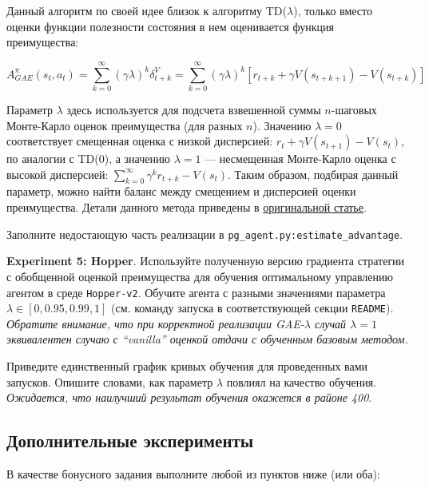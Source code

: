 \documentclass[12pt, oneside]{article}
\begin{document}
Данный алгоритм по своей идее близок к алгоритму TD($\lambda$), только вместо оценки функции полезности состояния в нем оценивается функция преимущества:

\begin{equation}
    A_{GAE}^\pi (s_t, a_t) = \sum_{k=0}^{\infty} {(\gamma \lambda)^k \delta_{t+k}^V} = \sum_{k=0}^{\infty} {(\gamma \lambda)^k [r_{t+k} + \gamma V(s_{t+k+1}) - V(s_{t+k})]}
\end{equation}

\noindent
Параметр $\lambda$ здесь используется для подсчета взвешенной суммы $n$-шаговых Монте-Карло оценок преимущества (для разных $n$). Значению $\lambda = 0$ соответствует смещенная оценка с низкой дисперсией: $r_t + \gamma V(s_{t+1}) - V(s_t)$, по аналогии с TD(0), а значению $\lambda = 1$ --- несмещенная Монте-Карло оценка с высокой дисперсией: $\sum_{k=0}^{\infty} {\gamma^k r_{t+k}} - V(s_t)$. Таким образом, подбирая данный параметр, можно найти баланс между смещением и дисперсией оценки преимущества. Детали данного метода приведены в \href{https://arxiv.org/pdf/1506.02438.pdf}{оригинальной статье}.

Заполните недостающую часть реализации в \verb|pg_agent.py:estimate_advantage|.

\textbf{Experiment 5: Hopper}. Используйте полученную версию градиента стратегии с обобщенной оценкой преимущества для обучения оптимальному управлению агентом в среде \verb|Hopper-v2|. Обучите агента с разными значениями параметра $\lambda \in [0, 0.95, 0.99, 1]$ (см. команду запуска в соответствующей секции \verb|README|). \textit{Обратите внимание, что при корректной реализации GAE-$\lambda$ случай $\lambda = 1$ эквивалентен случаю с ``vanilla'' оценкой отдачи с обученным базовым методом.}

Приведите единственный график кривых обучения для проведенных вами запусков. Опишите словами, как параметр $\lambda$ повлиял на качество обучения. \textit{Ожидается, что наилучший результат обучения окажется в районе 400}.

\subsection{Дополнительные эксперименты}

В качестве бонусного задания выполните любой из пунктов ниже (или оба):
\end{document}
